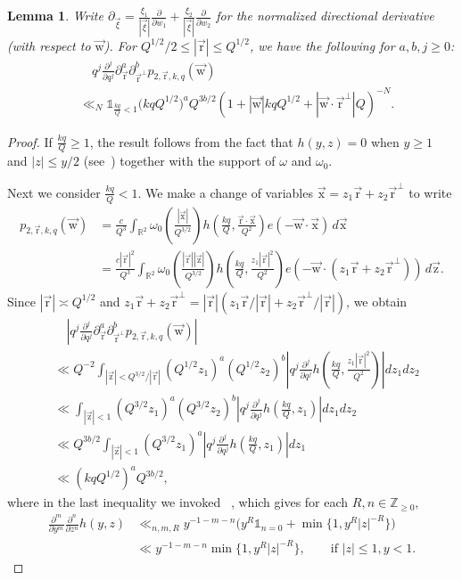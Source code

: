 \documentclass[letterpaper,11pt]{amsart}
\numberwithin{equation}{section}
\newtheorem{lemma}[theorem]{Lemma}
\theoremstyle{definition}
\numberwithin{equation}{section}
\newcommand{\Z}{\mathbb{Z}}
\newcommand{\ux}{{\vec{\mathrm{x}}}}
\newcommand{\ur}{\vec{\mathrm{r}}}
\newcommand{\uz}{{\vec{\mathrm{z}}}}
\newcommand{\uw}{{\vec{\mathrm{w}}}}
\newcommand{\R}{\mathbb{R}}
\begin{document}
\begin{lemma}\label{lem:nonstationary}
Write \(\partial_{\vec{\xi}} = \frac{\xi_1}{|\vec \xi|}\frac{\partial}{\partial w_1}+ \frac{\xi_2}{|\vec \xi|}\frac{\partial}{\partial w_2}\) for the normalized directional derivative (with respect to \(\uw \)). For $Q^{1/2}/2\leq |\ur|\leq Q^{1/2}$,  we have the following for \(a,b,j\geq 0\):
	\begin{align*}
		&\quad q^j\frac{\partial^j}{\partial q^j}
		\partial_{\ur }^a
		\partial_{\ur ^\perp}^b
		 p_{2,\ur,k,q}(\uw)
		\\&\ll_N
		\mathds 1_{\frac{kq}{Q}< 1}
		\big(kqQ^{1/2}\big)^a Q^{3b/2} 
		(1+|\uw|kqQ^{1/2}+|\uw\cdot \ur^\perp|Q)^{-N}.
	\end{align*}
\end{lemma}

\begin{proof}
	If \(\frac{kq}{Q}\geq 1\), the result follows from the fact that
	\(
	h(y,z)=0\) when \(y\geq 1\) and \(|z|\leq y/2\) (see~\cite[Lemma~4]{Heath-Brown96}) together with the support of $\omega$ and $\omega_{0}$.  
	
	Next we consider \(\frac{kq}{Q}< 1\).
We make a change of variables $\ux=z_1\ur+z_2\ur^\perp$ to write 
\begin{align}
p_{2,\ur,k,q}(\uw)&=\frac{c}{Q^3}
\int_{\R^2} 
\omega_0\left(\frac{|\ux|}{Q^{3/2}}\right)
h\left(
\frac{kq}{Q},
\frac{\ur\cdot \ux }{ Q^2}
\right)
e(-\uw\cdot \ux)
\,d\ux
\nonumber
\\
&=\frac{c|\ur|^2}{Q^3}
\int_{\R^2}
\omega_0\left(\frac{|\ur||\uz|}{Q^{3/2}}\right)
h\left(
\frac{kq}{Q},
\frac{z_1|\ur|^2 }{ Q^2}
\right)
e(-\uw\cdot (z_1\ur+z_2\ur^\perp))
\,d\uz.
\label{eq:exposing_h}
\end{align}		
Since $|\ur|\asymp Q^{1/2}$ and $z_1\ur+z_2\ur^\perp=|\ur|(z_1\ur/|\ur|+z_2\ur^\perp/|\ur|)$, we obtain
\begin{align*}
&\quad |
q^j\frac{\partial^j}{\partial q^j}
\partial_{\ur }^a
\partial_{\ur ^\perp}^b
p_{2,\ur,k,q}(\uw)|\\&\ll Q^{-2} \int_{|\uz|< Q^{3/2}/|\ur|}
(Q^{1/2} z_1)^a
(Q^{1/2} z_2)^b
\left|
q^j\frac{\partial^j}{\partial q^j}
h\left(
\frac{kq}{Q},
\frac{z_1 |\ur|^2}{ Q^2}
\right)\right|dz_1dz_2
\\
&\ll  \int_{|\uz|< 1}
(Q^{3/2} z_1)^a
(Q^{3/2} z_2)^b
\left|
q^j\frac{\partial^j}{\partial q^j}
h\left(
\frac{kq}{Q},z_1
\right)\right|dz_1dz_2
\\&\ll
Q^{3b/2}
\int_{|\uz|< 1}
(Q^{3/2} z_1)^a
\left|
q^j\frac{\partial^j}{\partial q^j}
h\left(
\frac{kq}{Q},z_1
\right)\right|dz_1
\\&\ll 
\left(kqQ^{1/2}\right)^a Q^{3b/2} 
,
\end{align*}
where in the last inequality we invoked ~\cite[Lemma~5]{Heath-Brown96}, which gives for each \(R,n\in\Z_{\geq 0}\),
\begin{align}\nonumber
	\frac{\partial^m}{\partial y^m}	\frac{\partial^n}{\partial z^n}h(y,z)
	&\ll_{n,m,R}y^{-1-m-n}\Big(y^R\mathds 1_{n=0}+
	\min\{1,y^R|z|^{-R}\}\Big)
	\\
	&\ll
	y^{-1-m-n}
	\min\{1,y^R|z|^{-R}\},
	\quad \quad \text{if }|z|\leq 1, y<1.
	\label{HBhbound}
\end{align}


\end{proof}
\end{document}
